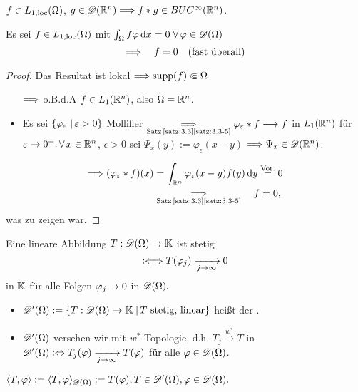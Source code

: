 \begin{bem}
  \label{bem:3.5}
  $f\in L_{1,\scriptsize{\textnormal{loc}}}(\Omega)$, $g\in\mathscr{D}(\mathbb{R}^n)\Longrightarrow f\ast g\in BUC^\infty(\mathbb{R}^n)$.
\end{bem}

\begin{theorem}
  \label{theorem:3.6}
  Es sei $f\in L_{1,\scriptsize{\textnormal{loc}}}(\Omega)$ mit $\int_\Omega f\varphi\,\mathrm{d} x=0\;\forall\,\varphi\in\mathscr{D}(\Omega)$
  \[ \Longrightarrow\quad f=0\quad(\text{fast überall}) \]
\end{theorem}

\begin{proof}
  Das Resultat ist lokal $\Longrightarrow\operatorname{supp}(f)\Subset\Omega$
  \begin{itemize}
  \item[$\Longrightarrow$] o.B.d.A $f\in L_1(\mathbb{R}^n)$, also $\Omega=\mathbb{R}^n$.
  \item Es sei $\{\varphi_\varepsilon\;\vert\, \varepsilon>0\}$ Mollifier $\underset{\scriptsize \text{Satz}\, \ref{satz:3.3}\eqref{satz:3.3-5}}{\Longrightarrow}\varphi_\varepsilon\ast f\longrightarrow f$ in $L_1(\mathbb{R}^n)$ für $\varepsilon\rightarrow 0^+. \,\forall\, x\in\mathbb{R}^n$, $\epsilon>0$ sei $\Psi_x(y):=\varphi_\epsilon(x-y)$ $\Longrightarrow\Psi_x\in\mathscr{D}(\mathbb{R}^n)$.
  \end{itemize}
   \begin{align*}
   	\Longrightarrow (\varphi_\varepsilon\ast f)(x)&=\int_{\mathbb{R}^n}\varphi_\varepsilon(x-y)f(y)\,\mathrm{d} y\overset{\scriptsize\text{Vor.}}=0 \\
	 &\underset{\scriptsize \text{Satz}\, \ref{satz:3.3}\eqref{satz:3.3-5}}{\Longrightarrow}  \quad  f=0,
\end{align*}
was zu zeigen war.
\end{proof}

\begin{defi}
  Eine lineare Abbildung $T:\mathscr{D}(\Omega)\rightarrow\mathbb{K}$ ist stetig 
  \[
  	:\Longleftrightarrow T(\varphi_j)\xrightarrow[j\rightarrow\infty]{}0
\]
in $\mathbb{K}$ für alle Folgen $\varphi_j\rightarrow 0$ in $\mathscr{D}(\Omega).$
  \begin{itemize}
  \item $\mathscr{D}'(\Omega):=\{T:\mathscr{D}(\Omega)\rightarrow\mathbb{K}\;\vert\, T\text{ stetig, linear}\}$ heißt der .
  \item $\mathscr{D}'(\Omega)$ versehen wir mit $w^*$-Topologie, d.h. $T_j\xrightarrow{w^*}T$ in $\mathscr{D}'(\Omega):\Leftrightarrow T_j(\varphi)\xrightarrow[j\rightarrow\infty]{} T(\varphi)$ für alle $\varphi\in\mathscr{D}(\Omega)$.
  \end{itemize}
\end{defi}

\begin{notation}
  $
  \langle T,\varphi \rangle:=\langle T,\varphi\rangle_{\mathscr{D}(\Omega)}:=T(\varphi),
   T\in\mathscr{D}'(\Omega), \varphi\in\mathscr{D}(\Omega).
  $
\end{notation}

